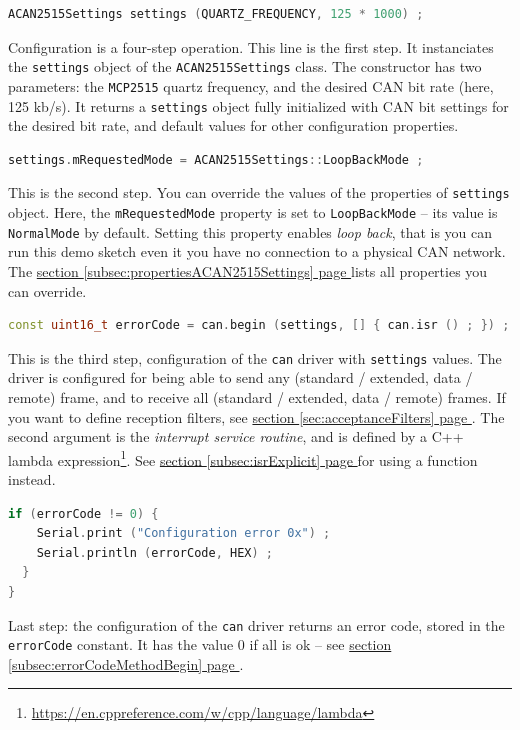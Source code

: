 \documentclass[10pt, a4paper, obeyspaces]{extarticle}
\newcommand\refSectionPage[1]{\hyperref[sec:#1]{section \ref*{sec:#1} page \pageref{sec:#1}}}
\newcommand\refSubsectionPage[1]{\hyperref[subsec:#1]{section \ref*{subsec:#1} page \pageref{subsec:#1}}}
\begin{document}
{ \small\begin{lstlisting}[language=c++]
  ACAN2515Settings settings (QUARTZ_FREQUENCY, 125 * 1000) ;
\end{lstlisting}}

Configuration is a four-step operation. This line is the first step. It instanciates the \texttt{settings} object of the \texttt{ACAN2515Settings} class. The constructor has two parameters: the \texttt{MCP2515} quartz frequency, and the desired CAN bit rate (here, 125 kb/s). It returns a \texttt{settings} object fully initialized with CAN bit settings for the desired bit rate, and default values for other configuration properties.






{ \small\begin{lstlisting}[language=c++]
  settings.mRequestedMode = ACAN2515Settings::LoopBackMode ;
\end{lstlisting}}
This is the second step. You can override the values of the properties of \texttt{settings} object. Here, the \texttt{mRequestedMode} property is set to \texttt{LoopBackMode} -- its value is \texttt{NormalMode} by default. Setting this property enables \emph{loop back}, that is you can run this demo sketch even it you have no connection to a physical CAN network. The \refSubsectionPage{propertiesACAN2515Settings} lists all properties you can override.





{ \small\begin{lstlisting}[language=c++]
  const uint16_t errorCode = can.begin (settings, [] { can.isr () ; }) ;
\end{lstlisting}}
This is the third step, configuration of the \texttt{can} driver with \texttt{settings} values. The driver is configured for being able to send any (standard / extended, data / remote) frame, and to receive all (standard / extended, data / remote) frames. If you want to define reception filters, see \refSectionPage{acceptanceFilters}. The second argument is the \emph{interrupt service routine}, and is defined by a C++ lambda expression\footnote{\url{https://en.cppreference.com/w/cpp/language/lambda}}. See \refSubsectionPage{isrExplicit} for using a function instead.





{ \small\begin{lstlisting}[language=c++]
  if (errorCode != 0) {
    Serial.print ("Configuration error 0x") ;
    Serial.println (errorCode, HEX) ;
  }
}
\end{lstlisting}}
Last step: the configuration of the \texttt{can} driver returns an error code, stored in the \texttt{errorCode} constant. It has the value $0$ if all is ok -- see \refSubsectionPage{errorCodeMethodBegin}.
\end{document}

